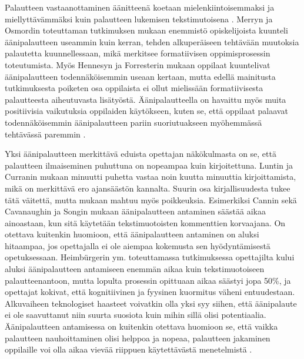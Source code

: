 \documentclass[utf8]{gradu3}
\begin{document}
Palautteen vastaanottaminen äänitteenä koetaan mielenkiintoisemmaksi ja miellyttävämmäksi kuin palautteen lukemisen tekstimutoisena \parencite{listenOrToRead}. Merryn ja Osmordin \parencite*{attitudes} toteuttaman tutkimuksen mukaan enemmistö opiskelijoista kuunteli äänipalautteen useammin kuin kerran, tehden alkuperäiseen tehtävään muutoksia palautetta kuunnellessaan, mikä merkitsee formatiivisen oppimisprosessin toteutumista. Myös Hennesyn ja Forresterin \parencite*{attitudes} mukaan oppilaat kuuntelivat äänipalautteen todennäköisemmin useaan kertaan, mutta edellä mainitusta tutkimuksesta poiketen osa oppilaista ei ollut mielissään formatiivisesta palautteesta aiheutuvasta lisätyöstä. Äänipalautteella on havaittu myös muita positiivisia vaikutuksia oppilaiden käytökseen, kuten se, että oppilaat palaavat todennäköisemmin äänipalautteen pariin suoriutuakseen myöhemmässä tehtävässä paremmin \parencite{voice}.

Yksi äänipalautteen merkittävä eduista opettajan näkökulmasta on se, että palautteen ilmaiseminen puhuttuna on nopeampaa kuin kirjoitettuna. Luntin ja Curranin \parencite*{areYouListening} mukaan minuutti puhetta vastaa noin kuutta minuuttia kirjoittamista, mikä on merkittävä ero ajansäästön kannalta. Suurin osa kirjallisuudesta tukee tätä väitettä, mutta mukaan mahtuu myös poikkeuksia. Esimerkiksi Cannin \parencite*{engaging} sekä Cavanaughin ja Songin \parencite*{versus} mukaan äänipalautteen antaminen säästää aikaa ainoastaan, kun sitä käytetään tekstimuotoisten kommenttien korvaajana. On otettava kuitenkin huomioon, että äänipalautteen antaminen on aluksi hitaampaa, jos opettajalla ei ole aiempaa kokemusta sen hyödyntämisestä opetuksessaan. Heimbürgerin ym. \parencite*{academics} toteuttamassa tutkimuksessa opettajilta kului aluksi äänipalautteen antamiseen enemmän aikaa kuin tekstimuotoiseen palautteenantoon, mutta lopulta prosessin opittuaan aikaa säästyi jopa 50\%, ja opettajat kokivat, että kognitiivinen ja fyysinen kuormitus väheni entuudestaan. Alkuvaiheen teknologiset haasteet voivatkin olla yksi syy siihen, että äänipalaute ei ole saavuttanut niin suurta suosiota kuin mihin sillä olisi potentiaalia. Äänipalautteen antamisessa on kuitenkin otettava huomioon se, että vaikka palautteen nauhoittaminen olisi helppoa ja nopeaa, palautteen jakaminen oppilaille voi olla aikaa vievää riippuen käytettävästä menetelmistä \parencite{engaging}.
\end{document}
